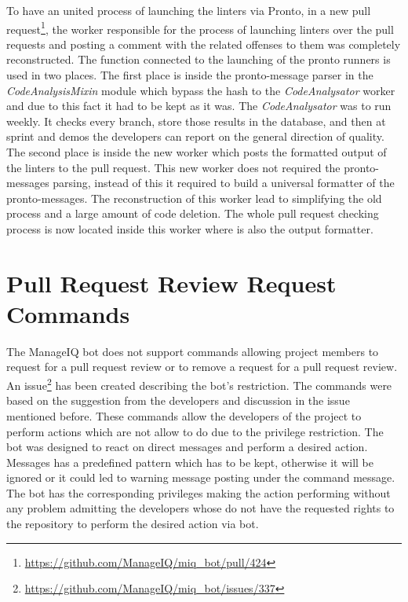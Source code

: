 To have an united process of launching the linters via Pronto, in a new pull request\footnote{\url{https://github.com/ManageIQ/miq_bot/pull/424}}, the worker responsible for the process of launching linters over the pull requests and posting a comment with the related offenses to them was completely reconstructed. The function connected to the launching of the pronto runners is used in two places. The first place is inside the pronto-message parser in the \textit{CodeAnalysisMixin} module which bypass the hash to the \textit{CodeAnalysator} worker and due to this fact it had to be kept as it was. The \textit{CodeAnalysator} was to run weekly. It checks every branch, store those results in the database, and then at sprint and demos the developers can report on the general direction of quality. The second place is inside the new worker which posts the formatted output of the linters to the pull request. This new worker does not required the pronto-messages parsing, instead of this it required to build a universal formatter of the pronto-messages.  The reconstruction of this worker lead to simplifying the old process and a large amount of code deletion. The whole pull request checking process is now located inside this worker where is also the output formatter.

\section{Pull Request Review Request Commands}

The ManageIQ bot does not support commands allowing project members to request for a pull request review or to remove a request for a pull request review. An issue\footnote{\url{https://github.com/ManageIQ/miq_bot/issues/337}} has been created describing the bot's restriction. The commands were based on the suggestion from the developers and discussion in the issue mentioned before. These commands allow the developers of the project to perform actions which are not allow to do due to the privilege restriction. The bot was designed to react on direct messages and perform a desired action. Messages has a predefined pattern which has to be kept, otherwise it will be ignored or it could led to warning message posting under the command message. The bot has the corresponding privileges making the action performing without any problem admitting the developers whose do not have the requested rights to the repository to perform the desired action via bot.

